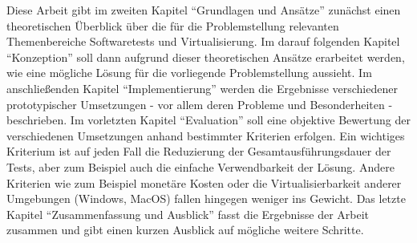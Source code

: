 Diese Arbeit gibt im zweiten Kapitel "`Grundlagen und Ansätze"' zunächst einen theoretischen Überblick über die für die Problemstellung relevanten Themenbereiche Softwaretests und Virtualisierung. Im darauf folgenden Kapitel "`Konzeption"' soll dann aufgrund dieser theoretischen Ansätze erarbeitet werden, wie eine mögliche Lösung für die vorliegende Problemstellung aussieht. Im anschließenden Kapitel "`Implementierung"' werden die Ergebnisse verschiedener prototypischer Umsetzungen - vor allem deren Probleme und Besonderheiten - beschrieben. Im vorletzten Kapitel "`Evaluation"' soll eine objektive Bewertung der verschiedenen Umsetzungen anhand bestimmter Kriterien erfolgen. Ein wichtiges Kriterium ist auf jeden Fall die Reduzierung der Gesamtausführungsdauer der Tests, aber zum Beispiel auch die einfache Verwendbarkeit der Lösung. Andere Kriterien wie zum Beispiel monetäre Kosten oder die Virtualisierbarkeit anderer Umgebungen (Windows, MacOS) fallen hingegen weniger ins Gewicht. Das letzte Kapitel "`Zusammenfassung und Ausblick"' fasst die Ergebnisse der Arbeit zusammen und gibt einen kurzen Ausblick auf mögliche weitere Schritte.

